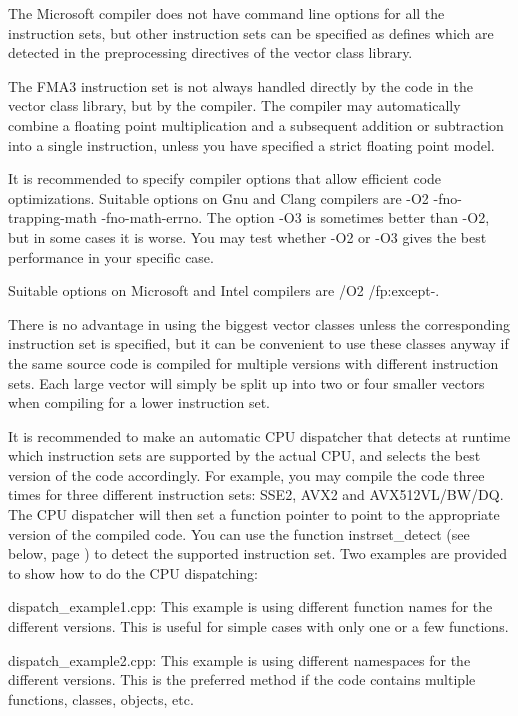 \documentclass[vcl_manual.tex]{subfiles}
\begin{document}
The Microsoft compiler does not have command line options for all the instruction sets, but other instruction sets can be specified as defines which are detected in the preprocessing directives of the vector class library.

The FMA3 instruction set is not always handled directly by the code in the vector class library, but by the compiler. The compiler may automatically combine a floating point multiplication and a subsequent addition or subtraction into a single instruction, unless you have specified a strict floating point model.

It is recommended to specify compiler options that allow efficient code optimizations. Suitable options on Gnu and Clang compilers are
-O2 -fno-trapping-math -fno-math-errno. The option -O3 is sometimes better than -O2, but in some cases it is worse. You may test whether -O2 or -O3 gives the best performance in your specific case.

Suitable options on Microsoft and Intel compilers are /O2 /fp:except-.

There is no advantage in using the biggest vector classes unless the corresponding instruction set is specified, but it can be convenient to use these classes anyway if the same source code is compiled for multiple versions with different instruction sets. Each large vector will simply be split up into two or four smaller vectors when compiling for a lower instruction set.

It is recommended to make an automatic CPU dispatcher that detects at runtime which instruction sets are supported by the actual CPU, and selects the best version of the code accordingly. For example, you may compile the code three times for three different instruction sets: SSE2, AVX2 and AVX512VL/BW/DQ. The CPU dispatcher will then set a function pointer to point to the appropriate version of the compiled code. You can use the function instrset\_detect (see below, page \pageref{instrsetDetect}) to detect the supported instruction set.
Two examples are provided to show how to do the CPU dispatching:

dispatch\_example1.cpp: This example is using different function names for the different versions. This is useful for simple cases with only one or a few functions.

dispatch\_example2.cpp: This example is using different namespaces for the different versions. This is the preferred method if the code contains multiple functions, classes, objects, etc.
\end{document}
